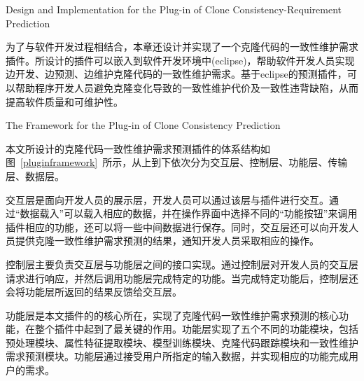 

{Design and Implementation for the Plug-in of Clone Consistency-Requirement Prediction}

为了与软件开发过程相结合，本章还设计并实现了一个克隆代码的一致性维护需求插件。所设计的插件可以嵌入到软件开发环境中(eclipse)，帮助软件开发人员实现边开发、边预测、边维护克隆代码的一致性维护需求。基于eclipse的预测插件，可以帮助程序开发人员避免克隆变化导致的一致性维护代价及一致性违背缺陷，从而提高软件质量和可维护性。

{The Framework for the Plug-in of Clone Consistency Prediction}

本文所设计的克隆代码一致性维护需求预测插件的体系结构如图~\ref{pluginframework}~所示，从上到下依次分为交互层、控制层、功能层、传输层、数据层。

交互层是面向开发人员的展示层，开发人员可以通过该层与插件进行交互。通过“数据载入”可以载入相应的数据，并在操作界面中选择不同的“功能按钮”来调用插件相应的功能，还可以将一些中间数据进行保存。同时，交互层还可以向开发人员提供克隆一致性维护需求预测的结果，通知开发人员采取相应的操作。

控制层主要负责交互层与功能层之间的接口实现。通过控制层对开发人员的交互层请求进行响应，并然后调用功能层完成特定的功能。当完成特定功能后，控制层还会将功能层所返回的结果反馈给交互层。

功能层是本文插件的的核心所在，实现了克隆代码一致性维护需求预测的核心功能，在整个插件中起到了最关键的作用。功能层实现了五个不同的功能模块，包括预处理模块、属性特征提取模块、模型训练模块、克隆代码跟踪模块和一致性维护需求预测模块。功能层通过接受用户所指定的输入数据，并实现相应的功能完成用户的需求。

